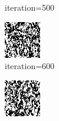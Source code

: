 \documentclass{article}
\begin{document}
\begin{figure}[h]
\begin{subfigure}[t]{0.18\textwidth}
\vspace{-0.6cm}
\caption{iteration=500}
\end{subfigure}\hspace{0.01\textwidth}
\begin{subfigure}[t]{0.18\textwidth}
\centering
\includegraphics[width=\textwidth]{./computational/results/gibbs_comb_sampler_negative_iter_600.png}
\vspace{-0.6cm}
\caption{iteration=600}
\end{subfigure}\hspace{0.01\textwidth}
\begin{subfigure}[t]{0.18\textwidth}
\centering
\includegraphics[width=\textwidth]{./computational/results/gibbs_comb_sampler_negative_iter_700.png}

\end{subfigure}
\end{figure}
\end{document}
